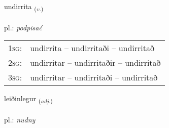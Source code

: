 \documentclass[frontgrid, backgrid]{flacards}\usepackage[]{graphicx}\usepackage[]{xcolor}
\begin{document}
\renewcommand{\flhead}{\vskip5pt \fboxsep=0pt {\small\bfseries\footnotesize Sagnorð | Verb}}
\renewcommand{\fcfoot}{\vskip5pt \fboxsep=0pt \hspace{2pt}{\small\bfseries\footnotesize 2K}}

\renewcommand{\blhead}{\vskip5pt {\small\bfseries\footnotesize Sagnorð | Verb }}
\renewcommand{\bcfoot}{\vskip5pt \hspace{2pt}{\small\bfseries\footnotesize 2K}}


{undirrita \small{\textsubscript{(\textit{v.})}} \\[1ex] %
\textphonetic{[ʏntɪrɪta]} \\
pl.: \emph{podpisać} \\  [2ex]
\renewcommand*{\arraystretch}{0.8}
\begin{tabular}{p{1cm}l}
\textsc{1sg}: & undirrita -- undirritaði -- undirritað \\ 
\textsc{2sg}: & undirritar -- undirritaðir -- undirritað \\ 
\textsc{3sg}: & undirritar -- undirritaði -- undirritað \\ 
\end{tabular}
}

\renewcommand{\flhead}{\vskip5pt \fboxsep=0pt {\small\bfseries\footnotesize Lýsingarorð | Adjective}}
\renewcommand{\fcfoot}{\vskip5pt \fboxsep=0pt \hspace{2pt}{\small\bfseries\footnotesize 2K}}

\renewcommand{\blhead}{\vskip5pt {\small\bfseries\footnotesize Lýsingarorð | Adjective }}
\renewcommand{\bcfoot}{\vskip5pt \hspace{2pt}{\small\bfseries\footnotesize 2K}}


{leiðinlegur \small{\textsubscript{(\textit{adj.})}} \\[1ex] %
\textphonetic{[leiːðɪnlɛɣʏr]} \\
pl.: \emph{nudny} \\  [2ex]
\renewcommand*{\arraystretch}{0.8}
}
\end{document}
